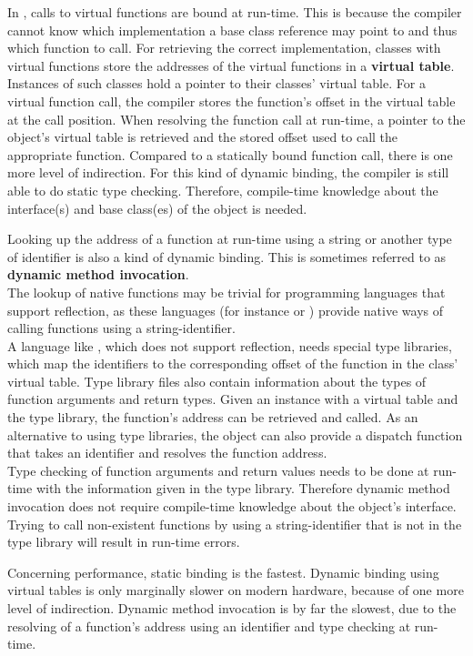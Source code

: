 In , calls to virtual functions are bound at run-time. This is because the compiler cannot know which implementation a base class reference may point to and thus which function to call. For retrieving the correct implementation, classes with virtual functions store the addresses of the virtual functions in a \textbf{virtual table}. Instances of such classes hold a pointer to their classes' virtual table. For a virtual function call, the compiler stores the function's offset in the virtual table at the call position. When resolving the function call at run-time, a pointer to the object's virtual table is retrieved and the stored offset used to call the appropriate function. Compared to a statically bound function call, there is one more level of indirection. For this kind of dynamic binding, the compiler is still able to do static type checking. Therefore, compile-time knowledge about the interface(s) and base class(es) of the object is needed. 

Looking up the address of a function at run-time using a string or another type of identifier is also a kind of dynamic binding. This is sometimes referred to as \textbf{dynamic method invocation}.\\
The lookup of native functions may be trivial for programming languages that support reflection, as these languages (for instance  or ) provide native ways of calling functions using a string-identifier.\\
A language like , which does not support reflection, needs special type libraries, which map the identifiers to the corresponding offset of the function in the class' virtual table. Type library files also contain information about the types of function arguments and return types. Given an instance with a virtual table and the type library, the function's address can be retrieved and called. As an alternative to using type libraries, the object can also provide a dispatch function that takes an identifier and resolves the function address.
\\Type checking of function arguments and return values needs to be done at run-time with the information given in the type library. Therefore dynamic method invocation does not require compile-time knowledge about the object's interface. Trying to call non-existent functions by using a string-identifier that is not in the type library will result in run-time errors.

Concerning performance, static binding is the fastest. Dynamic binding using virtual tables is only marginally slower on modern hardware, because of one more level of indirection. Dynamic method invocation is by far the slowest, due to the resolving of a function's address using an identifier and type checking at run-time. 

